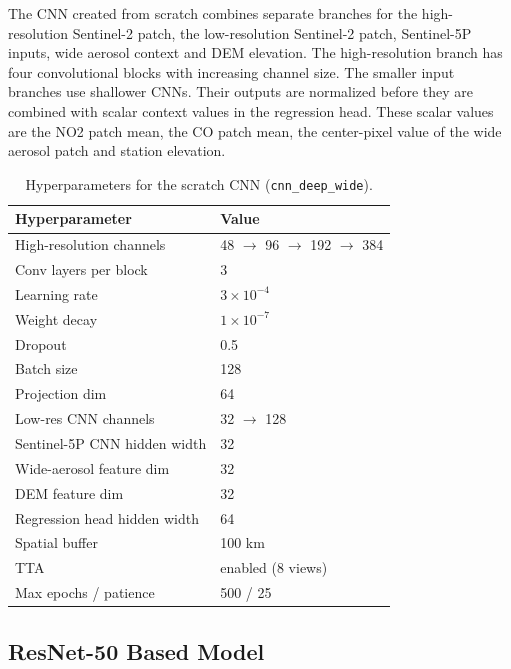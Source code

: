 \documentclass[english, a4paper]{article}
\begin{document}
The CNN created from scratch combines separate branches for the high-resolution Sentinel-2 patch, the low-resolution Sentinel-2 patch, Sentinel-5P inputs, wide aerosol context and DEM elevation. The high-resolution branch has four convolutional blocks with increasing channel size. The smaller input branches use shallower CNNs. Their outputs are normalized before they are combined with scalar context values in the regression head. These scalar values are the NO2 patch mean, the CO patch mean, the center-pixel value of the wide aerosol patch and station elevation.


\begin{table}[ht]
\centering
\caption{Hyperparameters for the scratch CNN (\texttt{cnn\_deep\_wide}).}
\label{tab:cnn_deep_wide_hparams}
\begin{tabular}{ll}
\hline
\textbf{Hyperparameter} & \textbf{Value} \\
\hline
High-resolution channels & 48 $\rightarrow$ 96 $\rightarrow$ 192 $\rightarrow$ 384 \\
Conv layers per block & 3 \\
Learning rate & $3\times10^{-4}$ \\
Weight decay & $1\times10^{-7}$ \\
Dropout & 0.5 \\
Batch size & 128 \\
Projection dim & 64 \\
Low-res CNN channels & 32 $\rightarrow$ 128 \\
Sentinel-5P CNN hidden width & 32 \\
Wide-aerosol feature dim & 32 \\
DEM feature dim & 32 \\
Regression head hidden width & 64 \\
Spatial buffer & 100 km \\
TTA & enabled (8 views) \\
Max epochs / patience & 500 / 25 \\
\hline
\end{tabular}
\end{table}




\subsection{ResNet-50 Based Model}
\end{document}
